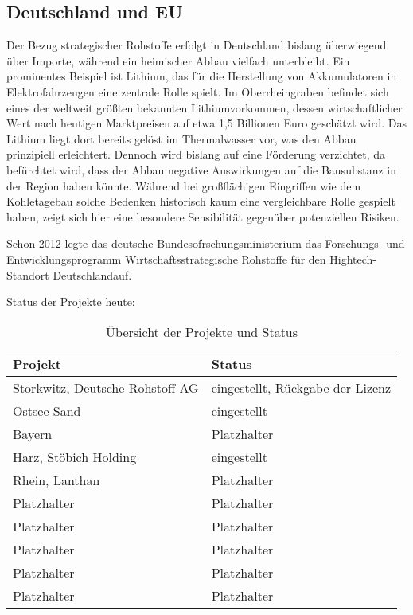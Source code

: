\documentclass[12pt,a4paper,oneside]{book} %
\begin{document}
\subsection{Deutschland und EU}

Der Bezug strategischer Rohstoffe erfolgt in Deutschland bislang überwiegend über Importe, während ein heimischer Abbau vielfach unterbleibt. Ein prominentes Beispiel ist Lithium, das für die Herstellung von Akkumulatoren in Elektrofahrzeugen eine zentrale Rolle spielt. Im Oberrheingraben befindet sich eines der weltweit größten bekannten Lithiumvorkommen, dessen wirtschaftlicher Wert nach heutigen Marktpreisen auf etwa 1,5 Billionen Euro geschätzt wird. Das Lithium liegt dort bereits gelöst im Thermalwasser vor, was den Abbau prinzipiell erleichtert. Dennoch wird bislang auf eine Förderung verzichtet, da befürchtet wird, dass der Abbau negative Auswirkungen auf die Bausubstanz in der Region haben könnte. Während bei großflächigen Eingriffen wie dem Kohletagebau solche Bedenken historisch kaum eine vergleichbare Rolle gespielt haben, zeigt sich hier eine besondere Sensibilität gegenüber potenziellen Risiken.


Schon 2012 legte das deutsche Bundesofrschungsministerium das Forschungs- und Entwicklungsprogramm \glqq Wirtschaftsstrategische Rohstoffe für den Hightech-Standort Deutschland\grqq auf.

Status der Projekte heute:

\begin{table}[ht]
	\centering
	\begin{tabular}{p{6cm} p{6cm}}
		\toprule
		\textbf{Projekt} & \textbf{Status} \\
		\midrule
		Storkwitz, Deutsche Rohstoff AG & eingestellt, Rückgabe der Lizenz \\
		Ostsee-Sand & eingestellt \\
		Bayern & Platzhalter \\
		Harz, Stöbich Holding & eingestellt \\
		Rhein, Lanthan & Platzhalter \\
		Platzhalter & Platzhalter \\
		Platzhalter & Platzhalter \\
		Platzhalter & Platzhalter \\
		Platzhalter & Platzhalter \\
		Platzhalter & Platzhalter \\
		\bottomrule
	\end{tabular}
	\caption{Übersicht der Projekte und Status}
	\label{tab:projekt_status}
\end{table}
\end{document}
